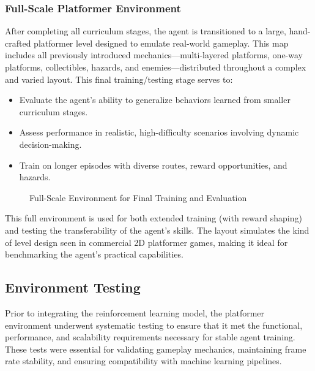 \documentclass[12pt,oneside,openright,a4paper]{cpe-english-project}
\begin{document}
\subsubsection{Full-Scale Platformer Environment}

After completing all curriculum stages, the agent is transitioned to a large, hand-crafted platformer level designed to emulate real-world gameplay. This map includes all previously introduced mechanics—multi-layered platforms, one-way platforms, collectibles, hazards, and enemies—distributed throughout a complex and varied layout. This final training/testing stage serves to:

\begin{itemize}
\item Evaluate the agent’s ability to generalize behaviors learned from smaller curriculum stages.
\item Assess performance in realistic, high-difficulty scenarios involving dynamic decision-making.
\item Train on longer episodes with diverse routes, reward opportunities, and hazards.
\end{itemize}

\begin{figure}[H]
\centering
{}
\caption{Full-Scale Environment for Final Training and Evaluation}\label{fig:FullLevel}
\end{figure}

This full environment is used for both extended training (with reward shaping) and testing the transferability of the agent’s skills. The layout simulates the kind of level design seen in commercial 2D platformer games, making it ideal for benchmarking the agent’s practical capabilities.

\subsection{Environment Testing}
Prior to integrating the reinforcement learning model, the platformer environment underwent systematic testing to ensure that it met the functional, performance, and scalability requirements necessary for stable agent training. These tests were essential for validating gameplay mechanics, maintaining frame rate stability, and ensuring compatibility with machine learning pipelines.
\end{document}

